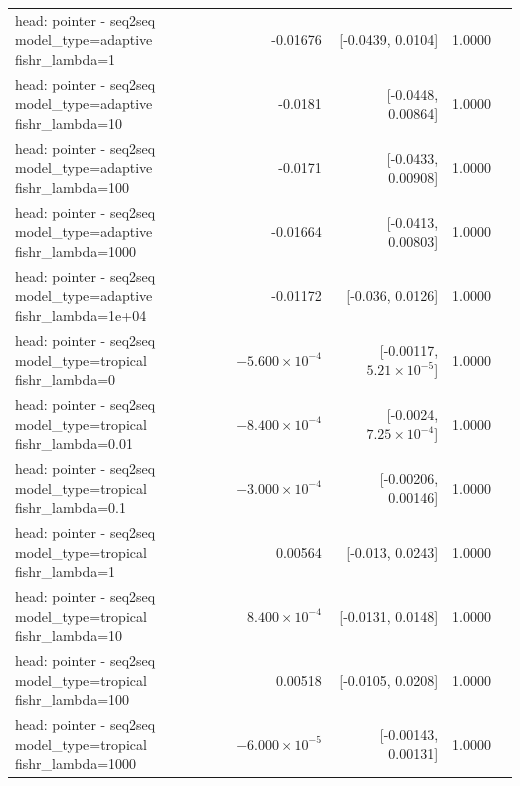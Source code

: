 \documentclass[10pt]{article}
\makeatletter
\newcommand{\stackcell}[1]{\begin{tabular}[t]{@{}l@{}}#1\end{tabular}}
\makeatother
\begin{document}
{\begin{longtable}{lrrrl}
\stackcell{head: pointer - seq2seq\\\footnotesize model\_type=adaptive fishr\_lambda=1 } & -0.01676 & [-0.0439, 0.0104] & 1.0000 & \\
\stackcell{head: pointer - seq2seq\\\footnotesize model\_type=adaptive fishr\_lambda=10 } & -0.0181 & [-0.0448, 0.00864] & 1.0000 & \\
\stackcell{head: pointer - seq2seq\\\footnotesize model\_type=adaptive fishr\_lambda=100 } & -0.0171 & [-0.0433, 0.00908] & 1.0000 & \\
\stackcell{head: pointer - seq2seq\\\footnotesize model\_type=adaptive fishr\_lambda=1000 } & -0.01664 & [-0.0413, 0.00803] & 1.0000 & \\
\stackcell{head: pointer - seq2seq\\\footnotesize model\_type=adaptive fishr\_lambda=1e+04 } & -0.01172 & [-0.036, 0.0126] & 1.0000 & \\
\stackcell{head: pointer - seq2seq\\\footnotesize model\_type=tropical fishr\_lambda=0 } & $-5.600\times10^{-4}$ & [-0.00117, $5.21\times10^{-5}$] & 1.0000 & \\
\stackcell{head: pointer - seq2seq\\\footnotesize model\_type=tropical fishr\_lambda=0.01 } & $-8.400\times10^{-4}$ & [-0.0024, $7.25\times10^{-4}$] & 1.0000 & \\
\stackcell{head: pointer - seq2seq\\\footnotesize model\_type=tropical fishr\_lambda=0.1 } & $-3.000\times10^{-4}$ & [-0.00206, 0.00146] & 1.0000 & \\
\stackcell{head: pointer - seq2seq\\\footnotesize model\_type=tropical fishr\_lambda=1 } & 0.00564 & [-0.013, 0.0243] & 1.0000 & \\
\stackcell{head: pointer - seq2seq\\\footnotesize model\_type=tropical fishr\_lambda=10 } & $8.400\times10^{-4}$ & [-0.0131, 0.0148] & 1.0000 & \\
\stackcell{head: pointer - seq2seq\\\footnotesize model\_type=tropical fishr\_lambda=100 } & 0.00518 & [-0.0105, 0.0208] & 1.0000 & \\
\stackcell{head: pointer - seq2seq\\\footnotesize model\_type=tropical fishr\_lambda=1000 } & $-6.000\times10^{-5}$ & [-0.00143, 0.00131] & 1.0000 & \\

\end{longtable}}
\end{document}
